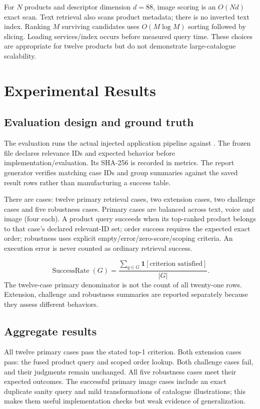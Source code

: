 \documentclass[11pt,a4paper]{article}
\newcommand{\reporttable}[1]{}
\begin{document}
For $N$ products and descriptor dimension $d=88$, image scoring is an $O(Nd)$ exact scan. Text retrieval also scans product metadata; there is no inverted text index. Ranking $M$ surviving candidates uses $O(M\log M)$ sorting followed by slicing. Loading services/index occurs before measured query time. These choices are appropriate for twelve products but do not demonstrate large-catalogue scalability.

\section{Experimental Results}\label{sec:results}
\subsection{Evaluation design and ground truth}
The evaluation runs the actual injected application pipeline against . The frozen file declares relevance IDs and expected behavior before implementation/evaluation. Its SHA-256 is recorded in metrics. The report generator verifies matching case IDs and group summaries against the saved result rows rather than manufacturing a success table.

There are \EvaluationRowCount{} cases: twelve primary retrieval cases, two extension cases, two challenge cases and five robustness cases. Primary cases are balanced across text, voice and image (four each). A product query succeeds when its top-ranked product belongs to that case's declared relevant-ID set; order success requires the expected exact order; robustness uses explicit empty/error/zero-score/scoping criteria. An execution error is never counted as ordinary retrieval success.

\begin{equation}
\operatorname{SuccessRate}(G)=\frac{\sum_{q\in G}\mathbf{1}[\text{criterion satisfied}]}{|G|}.
\end{equation}
The twelve-case primary denominator is not the count of all twenty-one rows. Extension, challenge and robustness summaries are reported separately because they assess different behaviors.

\subsection{Aggregate results}
\reporttable{metrics_table.tex}
\reporttable{mode_table.tex}
All twelve primary cases pass the stated top-1 criterion. Both extension cases pass: the fused product query and scoped order lookup. Both challenge cases fail, and their judgments remain unchanged. All five robustness cases meet their expected outcomes. The successful primary image cases include an exact duplicate sanity query and mild transformations of catalogue illustrations; this makes them useful implementation checks but weak evidence of generalization.
\end{document}
